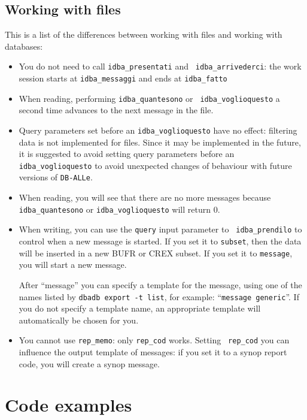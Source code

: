 \documentclass[final,12pt,a4paper,twoside]{book}
\newcommand{\dballe}{{\tt DB-ALLe}}
\begin{document}
\section{Working with files}
\label{db-file-differences}

This is a list of the differences between working with files and working with
databases:

\begin{itemize}
\item You do not need to call {\tt idba\_presentati} and {\tt
      idba\_arrivederci}: the work session starts at {\tt idba\_messaggi} and ends at
      {\tt idba\_fatto}
\item When reading, performing {\tt idba\_quantesono} or {\tt
      idba\_voglioquesto} a second time advances to the next message in the file.
\item Query parameters set before an {\tt idba\_voglioquesto} have no effect:
      filtering data is not implemented for files. Since it may be implemented
      in the future, it is suggested to avoid setting query parameters before
      an {\tt idba\_voglioquesto} to avoid unexpected changes of behaviour with
      future versions of \dballe{}.
\item When reading, you will see that there are no more messages because {\tt
      idba\_quantesono} or {\tt idba\_voglioquesto} will return 0.
\item When writing, you can use the {\tt query} input parameter to {\tt
      idba\_prendilo} to control when a new message is started.  If you set it
      to {\tt subset}, then the data will be inserted in a new BUFR or CREX
      subset.  If you set it to {\tt message}, you will start a new message.

      After ``message'' you can specify a template for the message, using one
      of the names listed by {\tt dbadb export -t list}, for example: ``{\tt message
      generic}''.  If you do not specify a template name, an appropriate template
      will automatically be chosen for you.
\item You cannot use {\tt rep\_memo}: only {\tt rep\_cod} works.  Setting {\tt
      rep\_cod} you can influence the output template of messages: if you set it to a
      synop report code, you will create a synop message.
\end{itemize}


\chapter{Code examples}
\label{ch-examples}
\end{document}
